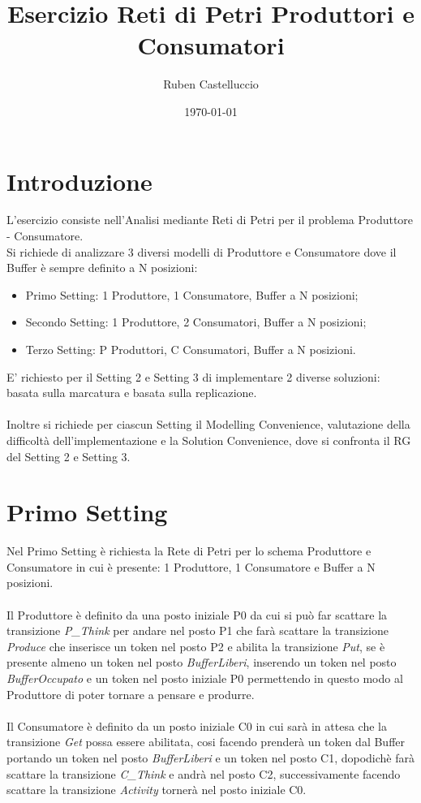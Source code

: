 \documentclass{article}
\begin{document}
\title{Esercizio Reti di Petri Produttori e Consumatori}
\author{Ruben Castelluccio}



   
 
\date{\today}

\maketitle
\section{Introduzione}
L'esercizio consiste nell'Analisi mediante Reti di Petri per il problema Produttore - Consumatore.
\\ Si richiede di analizzare 3 diversi modelli di Produttore e Consumatore dove il Buffer è sempre definito a N posizioni:
\begin{itemize}
    \item Primo Setting: 1 Produttore, 1 Consumatore, Buffer a N posizioni;
    \item Secondo Setting: 1 Produttore, 2 Consumatori, Buffer a N posizioni;
    \item Terzo Setting: P Produttori, C Consumatori, Buffer a N posizioni.
    \end{itemize}
    E' richiesto per il Setting 2 e Setting 3 di implementare 2 diverse soluzioni: basata sulla marcatura e basata sulla replicazione.
    \\\\Inoltre si richiede per ciascun Setting il Modelling Convenience, valutazione della difficoltà dell'implementazione e la Solution Convenience, dove si confronta il RG del Setting 2 e Setting 3.
    
\clearpage
\section{Primo Setting}
Nel Primo Setting è richiesta la Rete di Petri per lo schema Produttore e Consumatore in cui è presente: 1 Produttore, 1 Consumatore e Buffer a N posizioni.
\\\\Il Produttore è definito da una posto iniziale P0 da cui si può far scattare la transizione \textit{P\_Think} per andare nel posto P1 che farà scattare la transizione \textit{Produce} che inserisce un token nel posto P2 e abilita la transizione \textit{Put}, se è presente almeno un token nel posto \textit{BufferLiberi}, inserendo un token nel posto \textit{BufferOccupato} e un token nel posto iniziale P0 permettendo in questo modo al Produttore di poter tornare a pensare e produrre.
\\\\Il Consumatore è definito da un posto iniziale C0 in cui sarà in attesa che la transizione \textit{Get} possa essere abilitata, cosi facendo prenderà un token dal Buffer portando un token nel posto \textit{BufferLiberi} e un token nel posto C1, dopodichè farà scattare la transizione \textit{C\_Think} e andrà nel posto C2, successivamente facendo scattare la transizione \textit{Activity} tornerà nel posto iniziale C0.
\end{document}
